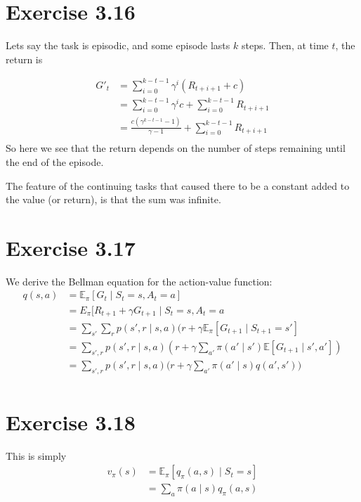 \documentclass[a4paper,11pt,reqno]{amsart}
\begin{document}
\section*{Exercise 3.16}
Lets say the task is episodic, and some episode lasts $k$ steps. Then, at time $t$, the return is

\begin{align}
    G'_t &= \sum_{i=0}^{k - t - 1} \gamma^{i} (R_{t + i + 1} + c)\\
    &= \sum_{i=0}^{k - t - 1} \gamma ^{i}c  + \sum_{i=0}^{k - t - 1} R_{t + i + 1} \\
    &= \frac{c(\gamma ^{k - t - 1} - 1)}{\gamma  - 1} + \sum_{i=0}^{k - t- 1} R_{t + i + 1} \\
\end{align}
So here we see that the return depends on the number of steps remaining until the end of the episode. 

The feature of the continuing tasks that caused there to be a constant added to the value (or return), is that the sum was infinite. 

\section*{Exercise 3.17}
We derive the Bellman equation for the action-value function:
\begin{align}
q(s, a) &= \mathbb{E}_\pi \left[ G_t \mid S_t =s, A_t = a \right]  \\
&= E_\pi [R_{t+1} + \gamma G_{t+1} \mid S_t = s, A_t = a \\
&= \sum_{s'} \sum_{r} p(s', r\mid s, a)(r + \gamma \mathbb{E}_\pi \left[ G_{t+1} \mid S_{t+1} = s' \right]  \\
&= \sum_{s', r}p(s', r \mid s, a)(r + \gamma \sum_{a'}\pi(a' \mid s') \mathbb{E}\left[ G_{t+1}\mid s', a' \right])   \\
&= \sum_{s', r}p(s', r \mid s, a)\Big(r + \gamma \sum_{a'} \pi (a'\mid s) q(a', s')\Big)  \\
\end{align}

\section*{Exercise 3.18}
This is simply 
\begin{align}
    v_\pi(s) &= \mathbb{E}_\pi \left[ q_{\pi }(a, s) \mid S_t = s \right] \\
        &= \sum_{a} \pi (a\mid s) q_{\pi }(a,s) \\
\end{align}
\end{document}
